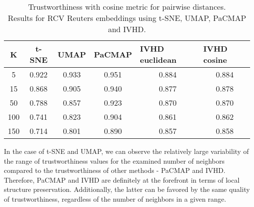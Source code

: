 \documentclass[12pt]{article}
\begin{document}
\begin{table}[h]
\centering
\caption{Trustworthiness with cosine metric for pairwise distances. \\
Results for RCV Reuters embeddings using t-SNE, UMAP, PaCMAP and IVHD.}
\begin{tabular}{|c|c|c|c|c|c|}
\hline
\textbf{K} & \textbf{t-SNE} & \textbf{UMAP} & \multicolumn{1}{l|}{\textbf{PaCMAP}} & \multicolumn{1}{l|}{\textbf{IVHD euclidean}} & \multicolumn{1}{l|}{\textbf{IVHD cosine}} \\ \hline
5          & 0.922          & 0.933         & 0.951                                & 0.884                                        & 0.884                                     \\ \hline
15         & 0.868          & 0.905         & 0.940                                & 0.877                                        & 0.878                                     \\ \hline
50         & 0.788          & 0.857         & 0.923                                & 0.870                                        & 0.870                                     \\ \hline
100        & 0.741          & 0.823         & 0.904                                & 0.861                                        & 0.862                                     \\ \hline
150        & 0.714          & 0.801         & 0.890                                & 0.857                                        & 0.858                                     \\ \hline
\end{tabular}
\end{table}
In the case of t-SNE and UMAP, we can observe the relatively large variability of the range of trustworthiness values for the examined number of neighbors compared to the trustworthiness of other methods - PaCMAP and IVHD. Therefore, PaCMAP and IVHD are definitely at the forefront in terms of local structure preservation. Additionally, the latter can be favored by the same quality of trustworthiness, regardless of the number of neighbors in a given range.
\end{document}
